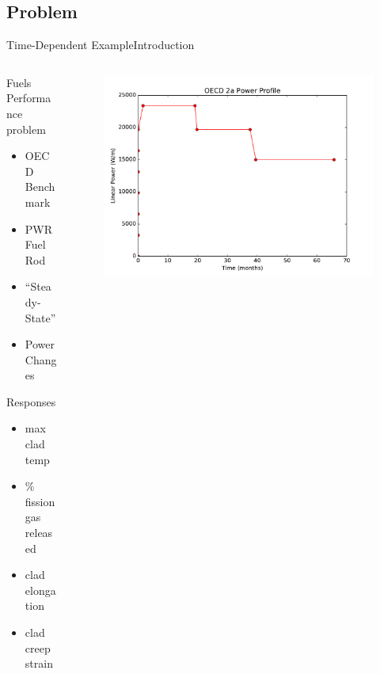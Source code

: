 \documentclass{beamer}
\begin{document}
\subsection{Problem}
\begin{frame}{Time-Dependent Example}{Introduction}\vspace{-20pt}
      \vfill
  \begin{columns}
    \begin{column}{0.5\textwidth}
      Fuels Performance problem
      \vfill
      \begin{itemize}
        \item OECD Benchmark
      \vfill
        \item PWR Fuel Rod
      \vfill
        \item ``Steady-State''
      \vfill
        \item Power Changes
      \end{itemize}
      \vfill
      Responses
      \begin{itemize}
        \item max clad temp
        \item \% fission gas released
        \item clad elongation
        \item clad creep strain
      \end{itemize}
    \end{column}
    \begin{column}{0.5\textwidth}
      \begin{figure}
        \centering
      \includegraphics[width=\linewidth]{oecd/oecd_power_profile}
      \end{figure}
    \end{column}
  \end{columns}
      \vfill
\end{frame}
\end{document}
